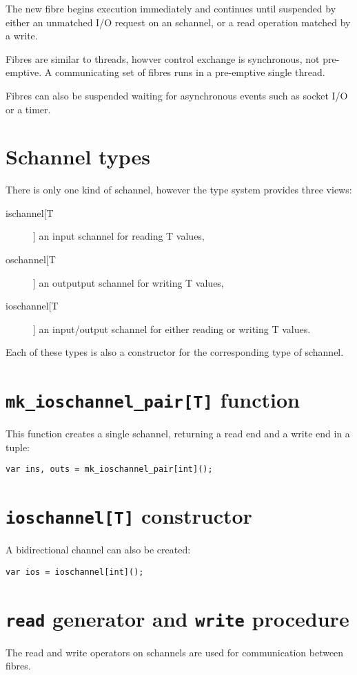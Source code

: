 \documentclass[oneside]{book}
\begin{document}
The new fibre begins execution immediately and continues
until suspended by either an unmatched I/O request on
an schannel, or a read operation matched by a write.

Fibres are similar to threads, howver control exchange is
synchronous, not pre-emptive. A communicating set of fibres
runs in a pre-emptive single thread.

Fibres can also be suspended waiting for asynchronous
events such as socket I/O or a timer.

\section{Schannel types}
There is only one kind of schannel, however the type system 
provides three views:

\begin{description}
\item[ischannel[T]] an input schannel for reading T values,
\item[oschannel[T]] an outputput schannel for writing T values,
\item[ioschannel[T]] an input/output schannel for either reading or writing T values.
\end{description}

Each of these types is also a constructor for the corresponding
type of schannel.

\section{{\tt mk\_ioschannel\_pair[T]} function}
This function creates a single schannel, returning a read end
and a write end in a tuple:

\begin{verbatim}
var ins, outs = mk_ioschannel_pair[int]();
\end{verbatim}

\section{{\tt ioschannel[T]} constructor}
A bidirectional channel can also be created:

\begin{verbatim}
var ios = ioschannel[int]();
\end{verbatim}


\section{{\tt read} generator and {\tt write} procedure}
The read and write operators on schannels are used for 
communication between fibres. 
\end{document}
